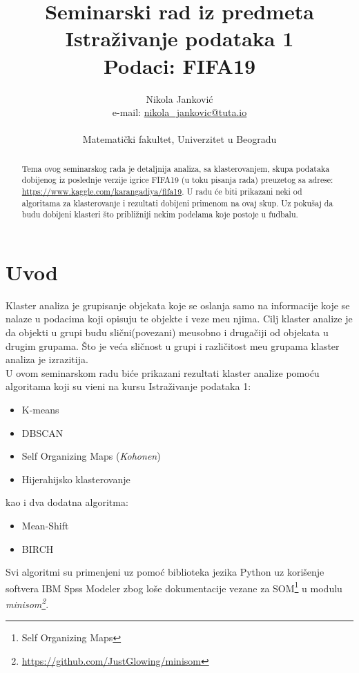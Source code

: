 \documentclass[a4paper, 11pt]{article}
\title{\large Seminarski rad iz predmeta Istra\v zivanje podataka 1
		\\ Podaci: FIFA19 }
\author{Nikola Jankovi\'c 
		\\ e-mail: \href{mailto:nikola_jankovic@tuta.io}{nikola\_jankovic@tuta.io}
		\\ \\ \small{Matemati\v cki fakultet, Univerzitet u Beogradu}
}
\begin{document}
\begin{titlepage}
\maketitle
\thispagestyle{empty}

\begin{abstract}
Tema ovog seminarskog rada je detaljnija analiza, sa klasterovanjem,
skupa podataka dobijenog iz poslednje verzije
igrice FIFA19 (u toku pisanja rada) preuzetog sa adrese: \url{https://www.kaggle.com/karangadiya/fifa19}.
U radu \'{c}e biti prikazani neki od algoritama za klasterovanje i rezultati dobijeni primenom na ovaj skup.
Uz poku\v{s}aj da budu dobijeni klasteri što pribli\v{z}niji nekim podelama koje postoje u fudbalu. 
\end{abstract}

\end{titlepage}

\tableofcontents

\section{Uvod}



Klaster analiza je grupisanje objekata koje se oslanja samo na informacije koje se nalaze u podacima
koji opisuju te objekte i veze me\dj u njima. Cilj klaster analize je da objekti u grupi budu sli\v{c}ni(povezani) me\dj{}usobno i druga\v{c}iji od objekata u drugim grupama.
\v{S}to je ve\'{c}a sli\v{c}nost u grupi i razli\v{c}itost me\dj{}u grupama klaster analiza je 
izrazitija. \\
U ovom seminarskom radu bi\'{c}e prikazani rezultati klaster analize pomo\'{c}u algoritama
koji su vi\dj{}eni na kursu Istra\v{z}ivanje podataka 1:
\begin{itemize}
\item K-means
\item DBSCAN
\item Self Organizing Maps (\emph{Kohonen})
\item Hijerahijsko klasterovanje
\end{itemize} 
kao i dva dodatna algoritma:
\begin{itemize}
\item Mean-Shift
\item BIRCH
\end{itemize}


Svi algoritmi su primenjeni uz pomo\'{c} biblioteka jezika Python uz
kori\v{s}enje softvera IBM Spss Modeler zbog lo\v{s}e dokumentacije
vezane za SOM\footnote{Self Organizing Maps} u modulu \emph{minisom\footnote{\url{https://github.com/JustGlowing/minisom}}}.
\end{document}
